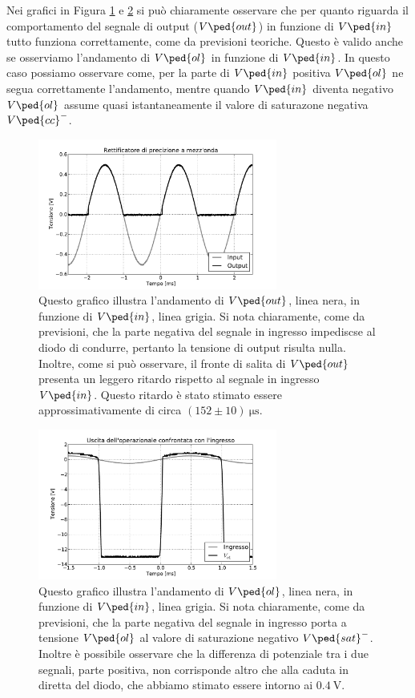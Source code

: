 Nei grafici in Figura \ref{fig:radd_plot1} e \ref{fig:radd_plot2} si può chiaramente osservare che per quanto riguarda il comportamento del segnale di output ($V\ped{out}$) in funzione di $V\ped{in}$ tutto funziona correttamente, come da previsioni teoriche. Questo è valido anche se osserviamo l'andamento di $V\ped{ol}$ in funzione di $V\ped{in}$. In questo caso possiamo osservare come, per la parte di $V\ped{in}$ positiva $V\ped{ol}$ ne segua correttamente l'andamento, mentre quando $V\ped{in}$ diventa negativo $V\ped{ol}$ assume quasi istantaneamente il valore di saturazone negativa $V\ped{cc}^-$.

\begin{figure}
        \centering
        \includegraphics[width=0.7\textwidth]{figure/rett.pdf}
        \caption{Questo grafico illustra l'andamento di $V\ped{out}$, linea nera, in funzione di $V\ped{in}$, linea grigia. Si nota chiaramente, come da previsioni, che la parte negativa del segnale in ingresso impediscse al diodo di condurre, pertanto la tensione di output risulta nulla. Inoltre, come si può osservare, il fronte di salita di $V\ped{out}$ presenta un leggero ritardo rispetto al segnale in ingresso $V\ped{in}$. Questo ritardo è stato stimato essere approssimativamente di circa $(152\pm10)\SI{}{\micro\second}$.}
        \label{fig:radd_plot1}
\end{figure}

\begin{figure}
        \centering
        \includegraphics[width=0.7\textwidth]{figure/rett_vo1.pdf}
        \caption{Questo grafico illustra l'andamento di $V\ped{ol}$, linea nera, in funzione di $V\ped{in}$, linea grigia. Si nota chiaramente, come da previsioni, che la parte negativa del segnale in ingresso porta a tensione $V\ped{ol}$ al valore di saturazione negativo $V\ped{sat}^-$. Inoltre è possibile osservare che la differenza di potenziale tra i due segnali, parte positiva, non corrisponde altro che alla caduta in diretta del diodo, che abbiamo stimato essere intorno ai $\SI{0.4}{\volt}$.}
        \label{fig:radd_plot2}
\end{figure}


